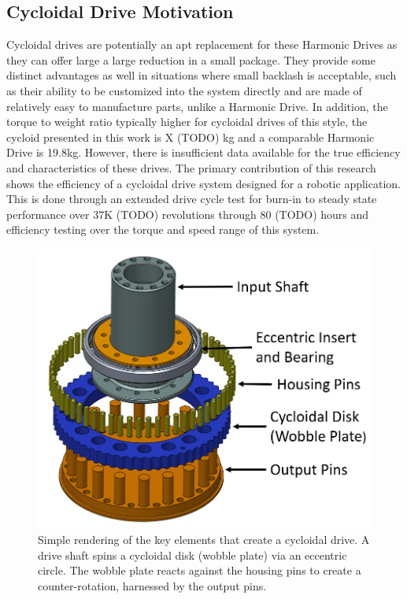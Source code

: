 \documentclass[letterpaper, 10 pt, conference]{ieeeconf}  %
\begin{document}
\subsection{Cycloidal Drive Motivation}

Cycloidal drives are potentially an apt replacement for these Harmonic Drives as they can offer large a large reduction in a small package. They provide some distinct advantages as well in situations where small backlash is acceptable, such as their ability to be customized into the system directly and are made of relatively easy to manufacture parts, unlike a Harmonic Drive. In addition, the torque to weight ratio typically higher for cycloidal drives of this style, the cycloid presented in this work is X (TODO) kg and a comparable Harmonic Drive is 19.8kg.
However, there is insufficient data available for the true efficiency and characteristics of these drives. The primary contribution of this research shows the efficiency of a cycloidal drive system designed for a robotic application. This is done through an extended drive cycle test for burn-in to steady state performance over 37K (TODO) revolutions through 80 (TODO) hours and efficiency testing over the torque and speed range of this system. 

   \begin{figure}[!b]
      \centering
      \includegraphics[width=0.50\linewidth]{cycloid_cartoon_v2}
      \caption{Simple rendering of the key elements that create a cycloidal drive. A drive shaft spins a cycloidal disk (wobble plate) via an eccentric circle. The wobble plate reacts against the housing pins to create a counter-rotation, harnessed by the output pins.}
      \label{cycloid_cartoon}
   \end{figure}
   
\end{document}
